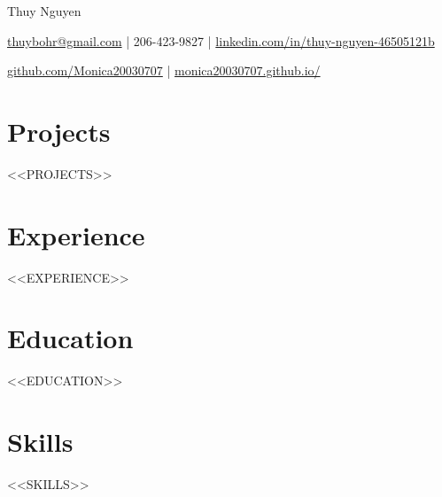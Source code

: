 \documentclass[11pt]{article}
\begin{document}

\centerline{\Huge Thuy Nguyen}

\vspace{5pt}

\centerline{\href{mailto:thuybohr@gmail.com}{thuybohr@gmail.com} | 206-423-9827 |
\href{https://www.linkedin.com/in/thuy-nguyen-46505121b/}{linkedin.com/in/thuy-nguyen-46505121b}}

\centerline{\href{https://github.com/Monica20030707}{github.com/Monica20030707} | 
\href{https://monica20030707.github.io/}{monica20030707.github.io/}} 

\vspace{-9pt}

\section*{Projects}

<<PROJECTS>>

\section*{Experience}

<<EXPERIENCE>>

\section*{Education}

<<EDUCATION>>

\section*{Skills}

<<SKILLS>>
\end{document}
